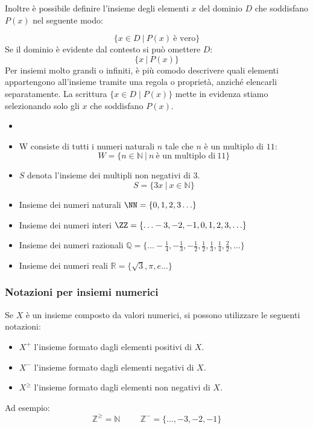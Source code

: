 Inoltre è possibile definire l'insieme degli elementi $x$ del dominio $D$ che soddisfano $P(x)$ nel seguente modo:

\[
\{x \in D \ | \ P(x) \ \text{è vero}\}
\]
Se il dominio è evidente dal contesto si può omettere $D$:
\[
\{x \ | \ P(x)\}
\]
Per insiemi molto grandi o infiniti, è più comodo descrivere quali elementi appartengono all'insieme tramite una regola o proprietà, anziché elencarli separatamente. La scrittura $\{x \in D \mid P(x)\}$ mette in evidenza stiamo selezionando solo gli $x$ che soddisfano $P(x)$.  
\begin{esempio}
\begin{itemize}
    \item[]
    \item W consiste di tutti i numeri naturali $n$ tale che $n$ è un multiplo di $11$:
    \[
    W=\{n\in \mathbb{N} \ | \ n \  \text{è un multiplo di} \ 11 \}
    \]
    \item $S$ denota l'insieme dei multipli non negativi di $3$.
    \[
    S= \{3x \ | \ x\in \mathbb{N}\}
    \]
    \item Insieme dei numeri naturali $\NN=\{0,1,2,3\ldots\}$
    \item Insieme dei numeri interi $\ZZ=\{\ldots -3,-2,-1,0,1,2,3,\ldots\}$
    \item Insieme dei numeri razionali $\mathbb{Q}=\{\ldots -\frac{1}{4},-\frac{1}{3},-\frac{1}{2},\frac{1}{2},\frac{1}{3},\frac{1}{4},\frac{2}{2},\ldots\}$
    \item Insieme dei numeri reali $\mathbb{R}=\{\sqrt{3}, \pi , e \ldots\}$
\end{itemize}
\end{esempio}
\subsubsection{Notazioni per insiemi numerici}

Se $X$ è un insieme composto da valori numerici, si possono utilizzare le seguenti notazioni:
\begin{itemize}
    \item $X^+$ l'insieme formato dagli elementi positivi di $X$. 
    \item $X^-$ l'insieme formato dagli elementi negativi di $X$. 
    \item $X^\geq$ l'insieme formato dagli elementi non negativi di $X$.
\end{itemize}
Ad esempio:
\[
\mathbb{Z^\geq} = \mathbb{N} \hspace{1cm}  \mathbb{Z^-} = \{\ldots,-3,-2,-1 \} 
\]


